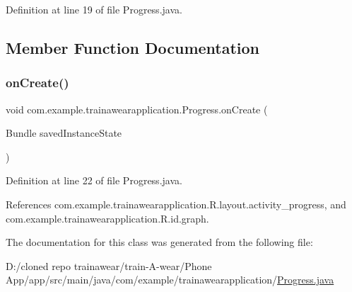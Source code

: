 Definition at line 19 of file Progress.\+java.



\subsection{Member Function Documentation}
\mbox{\label{classcom_1_1example_1_1trainawearapplication_1_1_progress_a839ad2f2cb526d70b32c517f54400f36}} 
\subsubsection{\texorpdfstring{onCreate()}{onCreate()}}
{\footnotesize\ttfamily void com.\+example.\+trainawearapplication.\+Progress.\+on\+Create (\begin{DoxyParamCaption}\item[{Bundle}]{saved\+Instance\+State }\end{DoxyParamCaption})\hspace{0.3cm}{\ttfamily [protected]}}



Definition at line 22 of file Progress.\+java.


\begin{DoxyCode}{0}

\end{DoxyCode}


References com.\+example.\+trainawearapplication.\+R.\+layout.\+activity\+\_\+progress, and com.\+example.\+trainawearapplication.\+R.\+id.\+graph.



The documentation for this class was generated from the following file\+:\begin{DoxyCompactItemize}
\item 
D\+:/cloned repo trainawear/train-\/\+A-\/wear/\+Phone App/app/src/main/java/com/example/trainawearapplication/\mbox{\hyperlink{_progress_8java}{Progress.\+java}}\end{DoxyCompactItemize}

